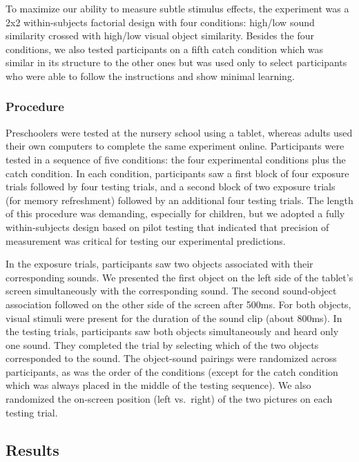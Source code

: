 \documentclass[english,,man,floatsintext]{apa6}
\theoremstyle{definition}
\theoremstyle{definition}
\theoremstyle{definition}
\theoremstyle{remark}
\begin{document}
To maximize our ability to measure subtle stimulus effects, the
experiment was a 2x2 within-subjects factorial design with four
conditions: high/low sound similarity crossed with high/low visual
object similarity. Besides the four conditions, we also tested
participants on a fifth catch condition which was similar in its
structure to the other ones but was used only to select participants who
were able to follow the instructions and show minimal learning.

\subsubsection{Procedure}\label{procedure}

Preschoolers were tested at the nursery school using a tablet, whereas
adults used their own computers to complete the same experiment online.
Participants were tested in a sequence of five conditions: the four
experimental conditions plus the catch condition. In each condition,
participants saw a first block of four exposure trials followed by four
testing trials, and a second block of two exposure trials (for memory
refreshment) followed by an additional four testing trials. The length
of this procedure was demanding, especially for children, but we adopted
a fully within-subjects design based on pilot testing that indicated
that precision of measurement was critical for testing our experimental
predictions.

In the exposure trials, participants saw two objects associated with
their corresponding sounds. We presented the first object on the left
side of the tablet's screen simultaneously with the corresponding sound.
The second sound-object association followed on the other side of the
screen after 500ms. For both objects, visual stimuli were present for
the duration of the sound clip (about 800ms). In the testing trials,
participants saw both objects simultaneously and heard only one sound.
They completed the trial by selecting which of the two objects
corresponded to the sound. The object-sound pairings were randomized
across participants, as was the order of the conditions (except for the
catch condition which was always placed in the middle of the testing
sequence). We also randomized the on-screen position (left vs.~right) of
the two pictures on each testing trial.

\subsection{Results}\label{results}
\end{document}

